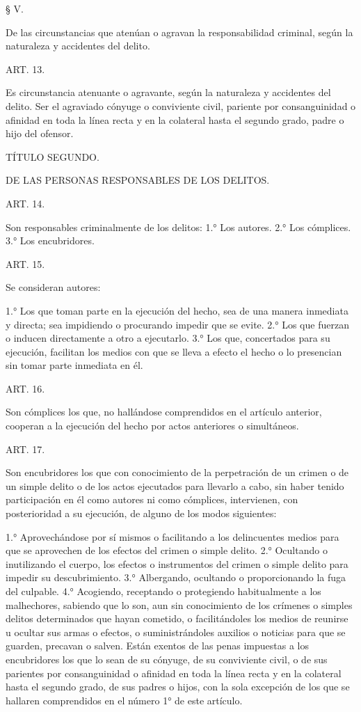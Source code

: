       § V.

De las circunstancias que atenúan o agravan la responsabilidad criminal, según la naturaleza y accidentes del delito.



    ART. 13.

    Es circunstancia atenuante o agravante, según la naturaleza y accidentes del delito.
    Ser el agraviado cónyuge o conviviente civil, pariente por consanguinidad o afinidad en toda la línea recta y en la colateral hasta el segundo grado, padre o hijo del ofensor.



    TÍTULO SEGUNDO.

    DE LAS PERSONAS RESPONSABLES DE LOS DELITOS.


    ART. 14.

    Son responsables criminalmente de los delitos:
    1.° Los autores.
    2.° Los cómplices.
    3.° Los encubridores.


    ART. 15.

    Se consideran autores:

    1.° Los que toman parte en la ejecución del hecho, sea de una manera inmediata y directa; sea impidiendo o procurando impedir que se evite.
    2.° Los que fuerzan o inducen directamente a otro a ejecutarlo.
    3.° Los que, concertados para su ejecución, facilitan los medios con que se lleva a efecto el hecho o lo presencian sin tomar parte inmediata en él.


    ART. 16.

    Son cómplices los que, no hallándose comprendidos en el artículo anterior, cooperan a la ejecución del hecho por actos anteriores o simultáneos.


    ART. 17.

    Son encubridores los que con conocimiento de la perpetración de un crimen o de un simple delito o de los actos ejecutados para llevarlo a cabo, sin haber tenido participación en él como autores ni como cómplices, intervienen, con posterioridad a su ejecución, de alguno de los modos siguientes:

    1.° Aprovechándose por sí mismos o facilitando a los delincuentes medios para que se aprovechen de los efectos del crimen o simple delito.
    2.° Ocultando o inutilizando el cuerpo, los efectos o instrumentos del crimen o simple delito para impedir su descubrimiento.
    3.° Albergando, ocultando o proporcionando la fuga del culpable.
    4.° Acogiendo, receptando o protegiendo habitualmente a los malhechores, sabiendo que lo son, aun sin conocimiento de los crímenes o simples delitos determinados que hayan cometido, o facilitándoles los medios de reunirse u ocultar sus armas o efectos, o suministrándoles auxilios o noticias para que se guarden, precavan o salven.
    Están exentos de las penas impuestas a los encubridores los que lo sean de su cónyuge, de su conviviente civil, o de sus parientes por consanguinidad o afinidad en toda la línea recta y en la colateral hasta el segundo grado, de sus padres o hijos, con la sola excepción de los que se hallaren comprendidos en el número 1° de este artículo.


